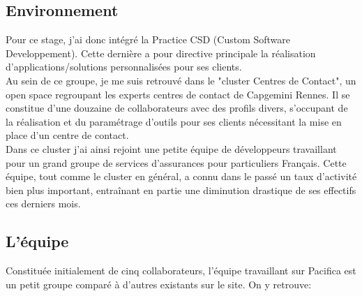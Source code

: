 \documentclass{rapport}
\begin{document}
\subsection{Environnement}

Pour ce stage, j'ai donc intégré la Practice CSD (Custom Software Developpement). Cette dernière a pour directive principale la réalisation d'applications/solutions personnalisées pour ses clients.\\

Au sein de ce groupe, je me suis retrouvé dans le "cluster Centres de Contact", un open space regroupant les experts centres de contact de Capgemini Rennes. Il se constitue d'une douzaine de collaborateurs avec des profils divers, s'occupant de la réalisation et du paramétrage d'outils pour ses clients nécessitant la mise en place d'un centre de contact.\\

Dans ce cluster j'ai ainsi rejoint une petite équipe de développeurs travaillant pour un grand groupe de services d’assurances pour particuliers Français. Cette équipe, tout comme le cluster en général, a connu dans le passé un taux d'activité bien plus important, entraînant en partie une diminution drastique de ses effectifs ces derniers mois.

\subsection{L'équipe}

Constituée initialement de cinq collaborateurs, l'équipe travaillant sur Pacifica est un petit groupe comparé à d'autres existants sur le site.
On y retrouve:\\
\end{document}
